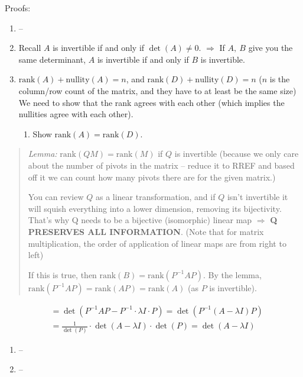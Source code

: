 \documentclass[
]{article}
\begin{document}
Proofs:

\begin{enumerate}
\def\labelenumi{\arabic{enumi}.}
\item
  --
\item
  Recall $A$ is invertible if and only if $\det(A) \neq 0$.
  $\Rightarrow$ If $A,\ B$ give you the same determinant, $A$ is
  invertible if and only if $B$ is invertible.
\item
  $\text{rank}(A) + \text{nullity}(A) = n$, and
  $\text{rank}(D) + \text{nullity}(D) = n$ ($n$ is the column/row
  count of the matrix, and they have to at least be the same size) We
  need to show that the rank agrees with each other (which implies the
  nullities agree with each other).

  \begin{enumerate}
  \def\labelenumii{\alph{enumii}.}
  \item
    Show $\text{rank}(A) = \text{rank}(D)$.
  \end{enumerate}
\end{enumerate}

\begin{quote}
\emph{Lemma:} $\text{rank}\left( QM \right) = \text{rank}(M)$
if $Q$ is invertible (because we only care about the number of pivots
in the matrix -- reduce it to RREF and based off it we can count how
many pivots there are for the given matrix.)

You can review $Q$ as a linear transformation, and if $Q$ isn't
invertible it will squish everything into a lower dimension, removing
its bijectivity. That's why Q needs to be a bijective (isomorphic)
linear map $\Rightarrow$ \textbf{Q PRESERVES ALL INFORMATION}. (Note
that for matrix multiplication, the order of application of linear maps
are from right to left)

If this is true, then
$\text{rank}(B) = \text{rank}\left( P^{- 1}AP \right)$. By the
lemma,
$\text{rank}\left( P^{- 1}AP \right) = \text{rank}\left( AP \right) = \text{rank}(A)$
(as $P$ is invertible).
\end{quote}

\begin{align*}
&= \det\left( P^{- 1}AP - P^{- 1} \cdot \lambda I \cdot P \right) = \det\left( P^{- 1}(A - \lambda I)P \right)
 \\
&= \frac{1}{\det(P)} \cdot \det(A - \lambda I) \cdot \det(P) = \det(A - \lambda I)
\end{align*}


\begin{enumerate}
\def\labelenumi{\arabic{enumi}.}
\setcounter{enumi}{3}
\item
  --
\item
  --
\end{enumerate}
\end{document}
